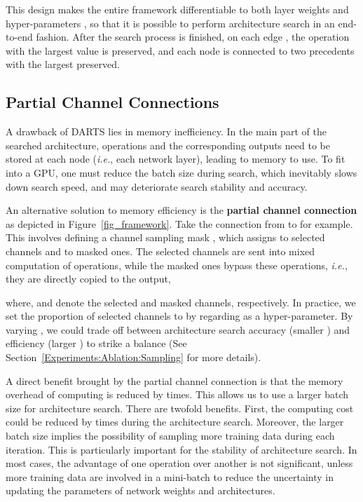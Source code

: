 \documentclass{article} \usepackage{iclr2020_conference,times}
\begin{document}
This design makes the entire framework differentiable to both layer weights and hyper-parameters , so that it is possible to perform architecture search in an end-to-end fashion. After the search process is finished, on each edge , the operation  with the largest  value is preserved, and each node  is connected to two precedents  with the largest  preserved.


\subsection{Partial Channel Connections}

A drawback of DARTS lies in memory inefficiency. In the main part of the searched architecture,  operations and the corresponding outputs need to be stored at each node (\textit{i.e.}, each network layer), leading to  memory to use. To fit into a GPU, one must reduce the batch size during search, which inevitably slows down search speed, and may deteriorate search stability and accuracy.

An alternative solution to memory efficiency is the \textbf{partial channel connection} as depicted in Figure~\ref{fig_framework}. Take the connection from  to  for example. This involves defining a channel sampling mask , which assigns  to selected channels and  to masked ones. The selected channels are sent into mixed computation of  operations, while the masked ones bypass these operations, \textit{i.e.}, they are directly copied to the output,

where,  and  denote the selected and masked channels, respectively. 
In practice, we set the proportion of selected channels to  by regarding  as a hyper-parameter. By varying , we could trade off between architecture search accuracy (smaller ) and efficiency (larger )  to strike a balance (See Section~\ref{Experiments:Ablation:Sampling} for more details).




A direct benefit brought by the partial channel connection is that the memory overhead of computing  is reduced by  times. This allows us to use a larger batch size for architecture search. There are twofold benefits. First, the computing cost could be reduced by  times during the architecture search. Moreover, the larger batch size implies the possibility of sampling more training data during each iteration. This is particularly important for the stability of architecture search. In most cases, the advantage of one operation over another is not significant, unless more training data are involved in a mini-batch to reduce the uncertainty in updating the parameters of network weights and architectures. 
\end{document}
